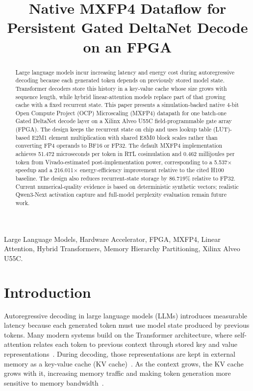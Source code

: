 \documentclass[conference]{IEEEtran}
\begin{document}
\title{Native MXFP4 Dataflow for Persistent Gated DeltaNet Decode on an FPGA\\
}

\author{
}

\maketitle

\begin{abstract}
Large language models incur increasing latency and energy cost during autoregressive decoding because each generated token depends on previously stored model state. Transformer decoders store this history in a key-value cache whose size grows with sequence length, while hybrid linear-attention models replace part of that growing cache with a fixed recurrent state. This paper presents a simulation-backed native 4-bit Open Compute Project (OCP) Microscaling (MXFP4) datapath for one batch-one Gated DeltaNet decode layer on a Xilinx Alveo U55C field-programmable gate array (FPGA). The design keeps the recurrent state on chip and uses lookup table (LUT)-based E2M1 element multiplication with shared E8M0 block scales rather than converting FP4 operands to BF16 or FP32. The default MXFP4 implementation achieves 51.472 microseconds per token in RTL cosimulation and 0.462 millijoules per token from Vivado-estimated post-implementation power, corresponding to a 5.537$\times$ speedup and a 216.011$\times$ energy-efficiency improvement relative to the cited H100 baseline. The design also reduces recurrent-state storage by 86.719\% relative to FP32. Current numerical-quality evidence is based on deterministic synthetic vectors; realistic Qwen3-Next activation capture and full-model perplexity evaluation remain future work.
\end{abstract}

\begin{IEEEkeywords}
Large Language Models, Hardware Accelerator, FPGA, MXFP4, Linear Attention, Hybrid Transformers, Memory Hierarchy Partitioning, Xilinx Alveo U55C.
\end{IEEEkeywords}

\section{Introduction}
Autoregressive decoding in large language models (LLMs) introduces measurable latency because each generated token must use model state produced by previous tokens. Many modern systems build on the Transformer architecture, where self-attention relates each token to previous context through stored key and value representations~\cite{b1}. During decoding, those representations are kept in external memory as a key-value cache (KV cache)~\cite{b2}. As the context grows, the KV cache grows with it, increasing memory traffic and making token generation more sensitive to memory bandwidth~\cite{b3}.
\end{document}
